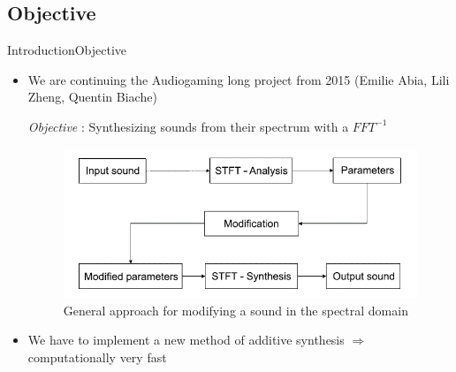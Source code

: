 \documentclass{bredelebeamer}
\begin{document}
\subsection{Objective}
\begin{frame}{Introduction}{Objective}


  \begin{itemize}
          \item<1-> We are continuing the Audiogaming long project from 2015 (Emilie Abia, Lili Zheng, Quentin Biache)
\begin{block}{}
\begin{center} {\it Objective} : Synthesizing sounds from their spectrum with a $ FFT^{-1} $ \end{center}
	\begin{figure}
	\includegraphics[scale=0.4]{Analysis_Synthesis.png}
	\caption{General approach for modifying a sound in the spectral domain}
	\end{figure}
\end{block}   
	\item<1-> We have to implement a new method of additive synthesis $\Rightarrow$ computationally very fast
  \end{itemize}
\end{frame}

\end{document}
